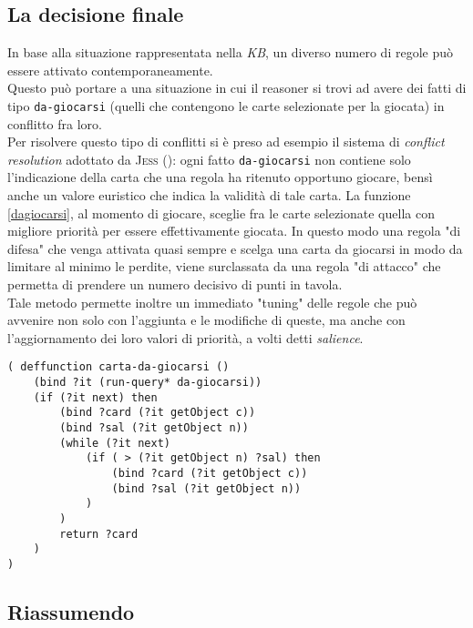\subsection{La decisione finale}

In base alla situazione rappresentata nella \emph{KB}, un diverso numero di regole può essere attivato contemporaneamente.\\
Questo può portare a una situazione in cui il reasoner si trovi ad avere dei fatti di tipo \texttt{da-giocarsi} (quelli che contengono le carte selezionate per la giocata) in conflitto fra loro.\\
Per risolvere questo tipo di conflitti si è preso ad esempio il sistema di \emph{conflict resolution} adottato da \textsc{Jess} (\cite{jessbook}): ogni fatto \texttt{da-giocarsi} non contiene solo l'indicazione della carta che una regola ha ritenuto opportuno giocare, bensì anche un valore euristico che indica la validità di tale carta.
La funzione \ref{dagiocarsi}, al momento di giocare, sceglie fra le carte selezionate quella con migliore priorità per essere effettivamente giocata.
In questo modo una regola "di difesa" che venga attivata quasi sempre e scelga una carta da giocarsi in modo da limitare al minimo le perdite, viene surclassata da una regola "di attacco" che permetta di prendere un numero decisivo di punti in tavola.\\
Tale metodo permette inoltre un immediato "tuning" delle regole che può avvenire non solo con l'aggiunta e le modifiche di queste, ma anche con l'aggiornamento dei loro valori di priorità, a volti detti \emph{salience}.

\begin{lstlisting}[caption={funzione che sceglie fra tutte quelle selezionate la carta da giocarsi},label=dagiocarsi]
( deffunction carta-da-giocarsi ()
    (bind ?it (run-query* da-giocarsi))
    (if (?it next) then
        (bind ?card (?it getObject c))
        (bind ?sal (?it getObject n))
        (while (?it next)
            (if ( > (?it getObject n) ?sal) then
                (bind ?card (?it getObject c))
                (bind ?sal (?it getObject n))
            )
        )
        return ?card
    )
)
\end{lstlisting}


\subsection{Riassumendo}

